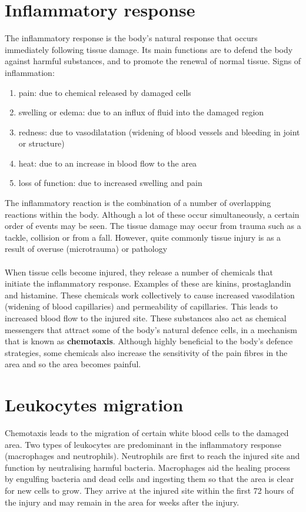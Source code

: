 \section{Inflammatory response}
The inflammatory response is the body’s natural response that occurs immediately following tissue damage.
 Its main functions are to defend the body against harmful substances, and to promote the renewal of normal tissue.
Signs of inflammation:
\begin{enumerate}
\item pain: due to chemical released by damaged cells
\item swelling or edema: due to an influx of fluid into the damaged region
\item redness: due to vasodilatation (widening of blood vessels and bleeding in joint or structure)
\item heat: due to an increase in blood flow to the area
\item loss of function: due to increased swelling and pain
\end{enumerate}
\noindent
The inflammatory reaction is the combination of a number of overlapping reactions within the body.
Although a lot of these occur simultaneously, a certain order of events may be seen.
The tissue damage may occur from trauma such as a tackle, collision or from a fall.
However, quite commonly tissue injury is as a result of overuse (microtrauma) or pathology
\\
\\
\noindent
When tissue cells become injured, they release a number of chemicals that initiate the inflammatory response.
Examples of these are kinins, prostaglandin and histamine.
These chemicals work collectively to cause increased vasodilation (widening of blood capillaries) and permeability of capillaries.
This leads to increased blood flow to the injured site.
These substances also act as chemical messengers that attract some of the body’s natural defence cells, in a mechanism that is known as \textbf{chemotaxis}.
Although highly beneficial to the body’s defence strategies, some chemicals also increase the sensitivity of the pain fibres in the area and so the area becomes painful.

\section{Leukocytes migration}
Chemotaxis leads to the migration of certain white blood cells to the damaged area.
Two types of leukocytes are predominant in the inflammatory response (macrophages and neutrophils).
Neutrophils are first to reach the injured site and function by neutralising harmful bacteria. Macrophages aid the healing process by engulfing bacteria and dead cells and ingesting them so that the area is clear for new cells to grow.
They arrive at the injured site within the first 72 hours of the injury and may remain in the area for weeks after the injury.

